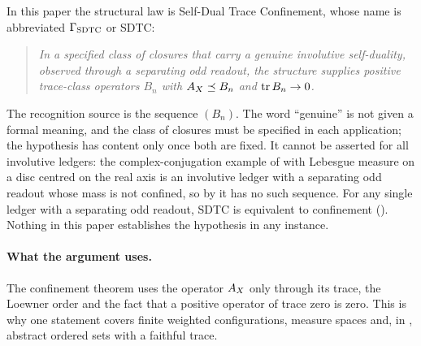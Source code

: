 In this paper the structural law is Self-Dual Trace Confinement, whose
name is abbreviated \(\Gamma_{\mathrm{SDTC}}\) or SDTC:
\begin{quote}
  \emph{In a specified class of closures that carry a genuine
  involutive self-duality, observed through a separating odd readout,
  the structure supplies positive trace-class operators \(B_n\) with
  \(A_{X}\preceq B_n\) and \(\operatorname{tr} B_n\to0\).}
\end{quote}
The recognition source is the sequence \((B_n)\).  The word
``genuine'' is not given a formal meaning, and the class of closures
must be specified in each application; the hypothesis has content
only once both are fixed.  It cannot be asserted for all involutive
ledgers: the complex-conjugation example of 
with Lebesgue measure on a disc centred on the real axis is an
involutive ledger with a
separating odd readout whose mass is not confined, so by
 it has no such
sequence.  For any single ledger with a separating odd readout, SDTC is
equivalent to confinement ().  Nothing in this paper establishes the hypothesis
in any instance.

\paragraph{What the argument uses.}
The confinement theorem uses the operator \(A_{X}\) only through its
trace, the Loewner order and the fact that a positive operator of
trace zero is zero.  This is why one statement covers finite weighted
configurations, measure spaces and, in
, abstract ordered sets
with a faithful trace.
